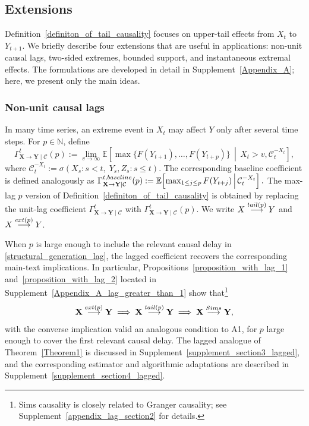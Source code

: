 \documentclass[a4paper,11pt]{article}
\newcommand{\toverset}[2]{\overset{{\rm #1}}{#2}}
\newcommand{\baseline}{{\rm baseline}}
\begin{document}
\subsection{Extensions}
\label{section_extensions}

Definition~\ref{definiton_of_tail_causality} focuses on upper-tail effects from \(X_t\) to \(Y_{t+1}\). We briefly describe four extensions that are useful in applications: non-unit causal lags, two-sided extremes, bounded support, and instantaneous extremal effects. The formulations are developed in detail in Supplement~\ref{Appendix_A}; here, we present only the main ideas.

\subsubsection{Non-unit causal lags}\label{lag_extention_in_section2}
In many time series, an extreme event in \(X_t\) may affect \(Y\) only after several time steps. For \(p\in\mathbb N\), define
\[
\Gamma^t_{\mathbf X\to \mathbf Y\mid\mathcal C}(p)
:=
\lim_{v\to\infty}
\mathbb E\!\left[
\max\{F(Y_{t+1}), \dots, F(Y_{t+p})\}
\,\middle|\,
X_t>v,\mathcal C^{-X_t}_t
\right],
\]
where \(
\mathcal C^{-X_t}_t
:=
\sigma(X_s:s<t,\;Y_s,Z_s:s\le t).
\) The corresponding baseline coefficient is defined analogously as  
\(
\Gamma^{t,\baseline}_{\mathbf X\to \mathbf Y\mid\mathcal C}(p)
:=
\mathbb E\!\left[
\max_{1\le j\le p} F(Y_{t+j})
\,\middle|\,
\mathcal C^{-X_t}_t
\right].
\) The max-lag \(p\) version of Definition~\ref{definiton_of_tail_causality} is obtained by replacing the unit-lag coefficient
\(\Gamma^t_{\mathbf X\to \mathbf Y\mid\mathcal C}\)
with
\(\Gamma^t_{\mathbf X\to \mathbf Y\mid\mathcal C}(p)\).
We write $\textbf{X}\toverset{tail(p)}{\longrightarrow}\textbf{Y}$ and $\textbf{X}\toverset{ext(p)}{\longrightarrow}\textbf{Y}$. 

When \(p\) is large enough to include the relevant causal delay in \eqref{structural_generation_lag}, the lagged coefficient recovers the corresponding main-text implications. In particular, Propositions~\ref{proposition_with_lag_1} and~\ref{proposition_with_lag_2} located in Supplement~\ref{Appendix_A_lag_greater_than_1} show that\footnote{Sims causality \citep{sims} is closely related to Granger causality;  see Supplement~\ref{appendix_lag_section2} for details.}
\[
\mathbf X\overset{{\rm ext}(p)}{\longrightarrow}\mathbf Y
\implies
\mathbf X\overset{{\rm tail}(p)}{\longrightarrow}\mathbf Y
\implies
\mathbf X\toverset{Sims}{\longrightarrow}\mathbf Y,
\]
with the converse implication valid an analogous condition to A1, for \(p\) large enough to cover the first relevant causal delay. The lagged analogue of Theorem~\ref{Theorem1} is discussed in Supplement~\ref{supplement_section3_lagged}, and the corresponding estimator and algorithmic adaptations are described in Supplement~\ref{supplement_section4_lagged}.
\end{document}
